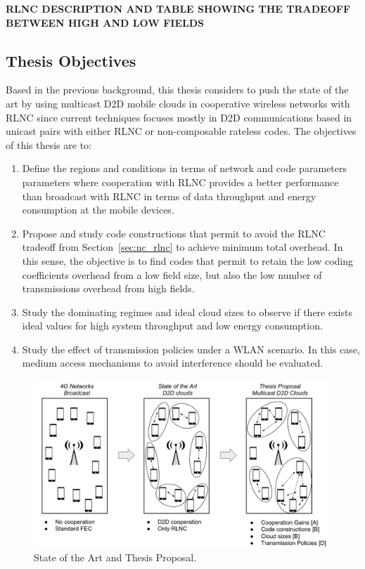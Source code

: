 \textbf{RLNC DESCRIPTION AND TABLE SHOWING THE TRADEOFF BETWEEN HIGH AND LOW FIELDS}

\subsection{Thesis Objectives}
Based in the previous background, this thesis considers to push the state of the art by using multicast \ac{D2D} mobile clouds in cooperative wireless networks with \ac{RLNC} since current techniques focuses mostly in \ac{D2D} communications based in unicast pairs with either \ac{RLNC} or non-composable rateless codes. The objectives of this thesis are to:

\begin{enumerate}

\item Define the regions and conditions in terms of network and code parameters parameters where cooperation with \ac{RLNC} provides a better performance than broadcast with \ac{RLNC} in terms of data throughput and energy consumption at the mobile devices.

\item Propose and study code constructions that permit to avoid the \ac{RLNC} tradeoff from Section~\ref{sec:nc_rlnc} to achieve minimum total overhead. In this sense, the objective is to find codes that permit to retain the low coding coefficients overhead from a low field size, but also the low number of transmissions overhead from high fields. 

\item Study the dominating regimes and ideal cloud sizes to observe if there exists ideal values for high system throughput and low energy consumption.

\item Study the effect of transmission policies under a \ac{WLAN} scenario. In this case, medium access mechanisms to avoid interference should be evaluated.
\end{enumerate}

\begin{figure}[ht!]
  \centering 
  \includegraphics[width=\textwidth]{introduction/figures/thesis-diagrams.pdf}
  \caption{State of the Art and Thesis Proposal.}
\label{fig:proposal}
\end{figure}

